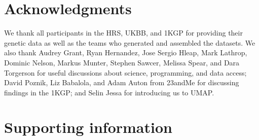 \section{Acknowledgments}
We thank all participants in the HRS, UKBB, and 1KGP for providing their genetic data as well as the teams who generated and assembled the datasets. We also thank Audrey Grant, Ryan Hernandez, Jose Sergio Hleap, Mark Lathrop, Dominic Nelson, Markus Munter, Stephen Sawcer, Melissa Spear, and Dara Torgerson for useful discussions about science, programming, and data access; David Poznik, Liz Babalola, and Adam Auton from 23andMe for discussing findings in the 1KGP; and Selin Jessa for introducing us to UMAP.


\clearpage

\section{Supporting information}

\makeatletter
\renewcommand\thetable{\@arabic\c@chapter s\@arabic\c@table}
\renewcommand \thefigure{\@arabic\c@chapter s\@arabic\c@figure}
\makeatother

\setcounter{figure}{0}  
\setcounter{table}{0}



\clearpage